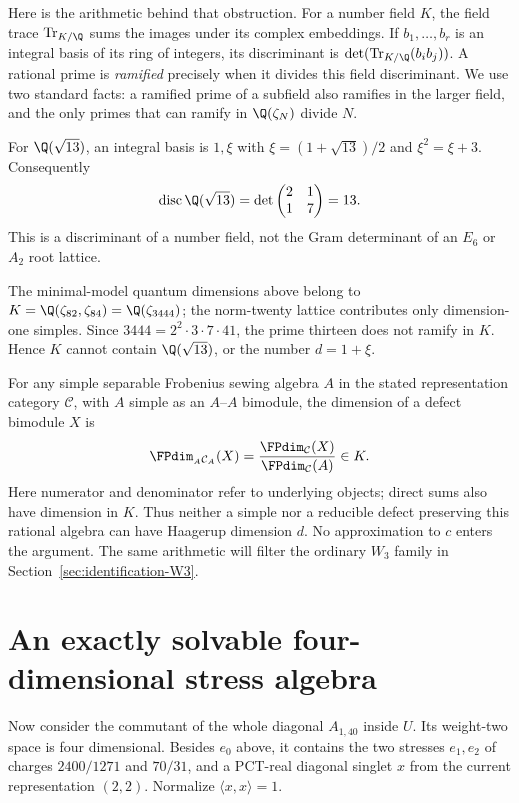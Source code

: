 \begin{example}
\label{ex:coset-ramification}
Here is the arithmetic behind that obstruction. For a number field
$K$, the field trace $\operatorname{Tr}_{K/\Q}$ sums the images
under its complex embeddings. If $b_1,\ldots,b_r$ is an integral
basis of its ring of integers, its discriminant is
$\det(\operatorname{Tr}_{K/\Q}(b_i b_j))$.
A rational prime is \emph{ramified} precisely when it divides
this field discriminant. We use two standard facts: a ramified
prime of a subfield also ramifies in the larger field, and the
only primes that can ramify in $\Q(\zeta_N)$ divide $N$.

For $\Q(\sqrt{13})$, an integral basis is $1,\xi$ with
$\xi=(1+\sqrt{13})/2$ and $\xi^2=\xi+3$. Consequently
\[
 \operatorname{disc}\Q(\sqrt{13})
 =\det\begin{pmatrix}2&1\\1&7\end{pmatrix}=13.
\]
This is a discriminant of a number field, not the Gram determinant
of an $E_6$ or $A_2$ root lattice.

The minimal-model quantum dimensions above belong to
$K=\Q(\zeta_{82},\zeta_{84})=\Q(\zeta_{3444})$;
the norm-twenty lattice contributes only dimension-one simples.
Since $3444=2^2\cdot3\cdot7\cdot41$, the prime thirteen does
not ramify in $K$. Hence $K$ cannot contain $\Q(\sqrt{13})$,
or the number $d=1+\xi$.

For any simple separable Frobenius sewing algebra $A$ in the
stated representation category $\mathcal C$, with $A$ simple
as an $A$--$A$ bimodule, the dimension of a defect bimodule $X$ is
\[
 \FPdim_{{}_A\mathcal C_A}(X)
   =\frac{\FPdim_{\mathcal C}(X)}{\FPdim_{\mathcal C}(A)}\in K.
\]
Here numerator and denominator refer to underlying objects;
direct sums also have dimension in $K$. Thus neither a simple
nor a reducible defect preserving this rational algebra can
have Haagerup dimension $d$. No approximation to $c$ enters
the argument. The same arithmetic will filter the ordinary
$W_3$ family in Section~\ref{sec:identification-W3}.
\end{example}

\section{An exactly solvable four-dimensional stress algebra}

Now consider the commutant of the whole diagonal $A_{1,40}$ inside
$U$. Its weight-two space is four dimensional. Besides $e_0$ above,
it contains the two stresses $e_1,e_2$ of charges $2400/1271$ and
$70/31$, and a PCT-real diagonal singlet $x$ from the current
representation $(2,2)$. Normalize $\langle x,x\rangle=1$.

